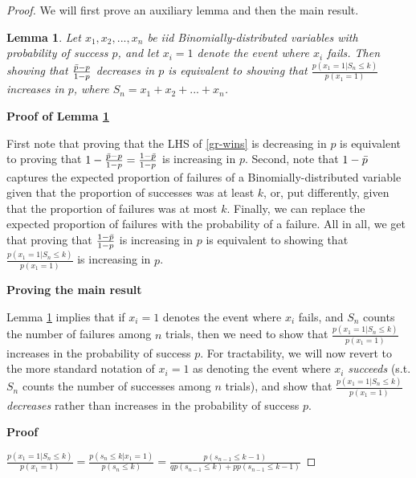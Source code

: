 \documentclass[12pt,a4paper]{article}
\newtheorem{lemma}{Lemma}
\begin{document}
\begin{proof}
We will first prove an auxiliary lemma and then the main result.
\begin{lemma}
\label{lemma:eqiv_formulation}
Let $x_1,x_2,...,x_n$ be iid Binomially-distributed variables with probability of success $p$, and let $x_i=1$ denote the event where $x_i$ fails. Then showing that $\frac{ \bar{p} - p}{ 1 - p}$ decreases in $p$ is equivalent to showing that $\frac{p(x_1=1|S_n \leq k)}{p(x_1=1)}$ increases in $p$, where $S_n=x_1+x_2+...+x_n$.
\end{lemma}
\textbf{Proof of Lemma \ref{lemma:eqiv_formulation}}

First note that proving that the LHS of \eqref{gr-wins} is decreasing in $p$ is equivalent to proving that $1-\frac{ \bar{p} - p}{ 1 - p} = \frac{ 1- \bar{p}}{ 1 - p}$ is increasing in $p$. Second, note that 
$1- \bar{p}$ captures the expected proportion of failures of a Binomially-distributed variable given that the proportion of successes was at least $k$, or, put differently, given that the proportion of failures was at most $k$. Finally, we can replace the expected proportion of failures with the probability of a failure. All in all, we get that proving that $\frac{ 1- \bar{p}}{ 1 - p}$ is increasing in $p$ is equivalent to showing that $\frac{p(x_1=1|S_n \leq k)}{p(x_1=1)}$ is increasing in $p$.
\vspace{0.3cm}

\textbf{Proving the main result}
\vspace{0.3cm}

Lemma \ref{lemma:eqiv_formulation} implies that if $x_i=1$ denotes the event where $x_i$ fails, and $S_n$ counts the number of failures among $n$ trials, then we need to show that $\frac{p(x_1=1|S_n \leq k)}{p(x_1=1)}$ increases in the probability of success $p$.
For tractability, we will now revert to the more standard notation of $x_i=1$ as denoting the event where $x_i$ \textit{succeeds} (s.t. $S_n$ counts the number of successes among $n$ trials), and show that $\frac{p(x_1=1|S_n \leq k)}{p(x_1=1)}$ \textit{decreases} rather than increases in the probability of success $p$.
\vspace{0.6 cm}

\textbf{Proof}

\vspace{0.3 cm}
$\frac{p(x_1=1|S_n \leq k)}{p(x_1=1)}=\frac{p(s_n \leq k|x_1=1)}{p(s_n \leq k)}=\frac{p(s_{n-1} \leq k-1)}{qp(s_{n-1} \leq k)+pp(s_{n-1} \leq k-1)}$


\end{proof}
\end{document}
